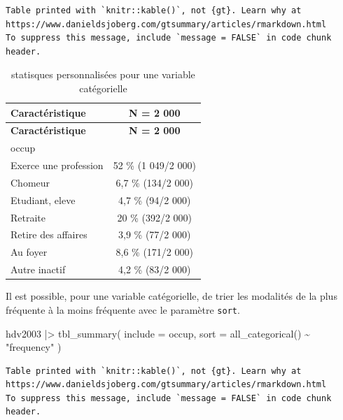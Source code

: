 \documentclass[
  letterpaper,
  DIV=11,
  numbers=noendperiod,
  oneside]{scrreprt}
\newenvironment{Shaded}{\begin{snugshade}}{\end{snugshade}}
\newcommand{\AttributeTok}[1]{\textcolor[rgb]{0.40,0.45,0.13}{#1}}
\newcommand{\FunctionTok}[1]{\textcolor[rgb]{0.28,0.35,0.67}{#1}}
\newcommand{\NormalTok}[1]{\textcolor[rgb]{0.00,0.23,0.31}{#1}}
\newcommand{\SpecialCharTok}[1]{\textcolor[rgb]{0.37,0.37,0.37}{#1}}
\newcommand{\StringTok}[1]{\textcolor[rgb]{0.13,0.47,0.30}{#1}}
\begin{document}
\begin{verbatim}
Table printed with `knitr::kable()`, not {gt}. Learn why at
https://www.danieldsjoberg.com/gtsummary/articles/rmarkdown.html
To suppress this message, include `message = FALSE` in code chunk header.
\end{verbatim}

\hypertarget{tbl-stat-var-cat}{}
\begin{longtable}[]{@{}lc@{}}
\caption{\label{tbl-stat-var-cat}statisques personnalisées pour une
variable catégorielle}\tabularnewline
\toprule()
\textbf{Caractéristique} & \textbf{N = 2 000} \\
\midrule()
\endfirsthead
\toprule()
\textbf{Caractéristique} & \textbf{N = 2 000} \\
\midrule()
\endhead
occup & \\
Exerce une profession & 52 \% (1 049/2 000) \\
Chomeur & 6,7 \% (134/2 000) \\
Etudiant, eleve & 4,7 \% (94/2 000) \\
Retraite & 20 \% (392/2 000) \\
Retire des affaires & 3,9 \% (77/2 000) \\
Au foyer & 8,6 \% (171/2 000) \\
Autre inactif & 4,2 \% (83/2 000) \\
\bottomrule()
\end{longtable}

Il est possible, pour une variable catégorielle, de trier les modalités
de la plus fréquente à la moins fréquente avec le paramètre
\texttt{sort}.

\begin{Shaded}
\begin{Highlighting}[]
\NormalTok{hdv2003 }\SpecialCharTok{|\textgreater{}}
  \FunctionTok{tbl\_summary}\NormalTok{(}
    \AttributeTok{include =}\NormalTok{ occup,}
    \AttributeTok{sort =} \FunctionTok{all\_categorical}\NormalTok{() }\SpecialCharTok{\textasciitilde{}} \StringTok{"frequency"}
\NormalTok{  )}
\end{Highlighting}
\end{Shaded}

\begin{verbatim}
Table printed with `knitr::kable()`, not {gt}. Learn why at
https://www.danieldsjoberg.com/gtsummary/articles/rmarkdown.html
To suppress this message, include `message = FALSE` in code chunk header.
\end{verbatim}
\end{document}
